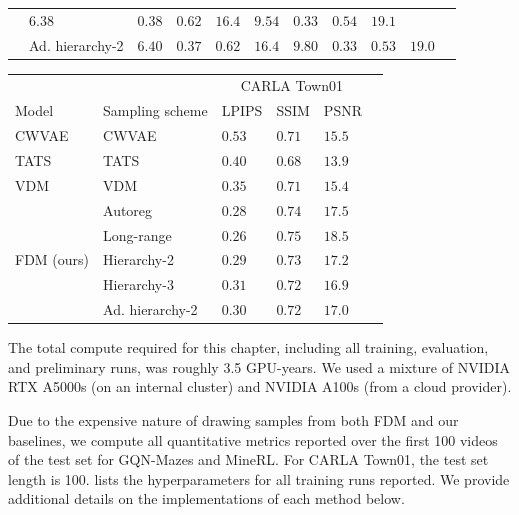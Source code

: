 \begin{table}[t]
\begin{tabular}{lllllllllll}
    & $6.38$ & $0.38$  & $0.62$  & $\mathbf{16.4}$  & $9.54$  & $0.33$  & $0.54$  & $19.1$  \\
                            &  Ad. hierarchy-2
    & $6.40$ & $\mathbf{0.37}$  & $0.62$  & $\mathbf{16.4}$  & $9.80$  & $0.33$  & $0.53$  & $19.0$ \\
    \bottomrule
  \end{tabular}
  \begin{tabular}{llllll}
    \toprule
    \multicolumn{1}{r}{} & & \multicolumn{3}{c}{CARLA Town01} \\
    \cmidrule(r){3-5}
    Model &  Sampling scheme    & LPIPS     & SSIM  & PSNR \\
    \midrule
    \multirow{1}{*}{CWVAE~\citep{saxena2021clockwork}}& CWVAE
    & $0.53$  & $0.71$  & $15.5$        \\
    \midrule
    \multirow{1}{*}{TATS~\citep{ge2022long}}& TATS
    & $0.40$  & $0.68$  & $13.9$        \\
    \midrule
    \multirow{1}{*}{VDM~\citep{ho2022video}}& VDM
    & $0.35$  & $0.71$  & $15.4$        \\
    \midrule
\multirow{5}{*}{FDM (ours)}   &  Autoreg
    & $0.28$  & $0.74$  & $17.5$        \\
                            &  Long-range
    & $\mathbf{0.26}$  & $\mathbf{0.75}$  & $\mathbf{18.5}$        \\
                            &  Hierarchy-2
    & $0.29$  & $0.73$  & $17.2$        \\
                            &  Hierarchy-3
    & $0.31$  & $0.72$  & $16.9$        \\
                            &  Ad. hierarchy-2
    & $0.30$  & $0.72$  & $17.0$        \\
    \bottomrule
  \end{tabular}
\end{table}


The total compute required for this chapter, including all training, evaluation, and preliminary runs, was roughly 3.5 GPU-years. We used a mixture of NVIDIA RTX A5000s (on an internal cluster) and NVIDIA A100s (from a cloud provider).

Due to the expensive nature of drawing samples from both FDM and our baselines, we compute all quantitative metrics reported over the first 100 videos of the test set for GQN-Mazes and MineRL. For CARLA Town01, the test set length is 100.  lists the hyperparameters for all training runs reported. We provide additional details on the implementations of each method below.

